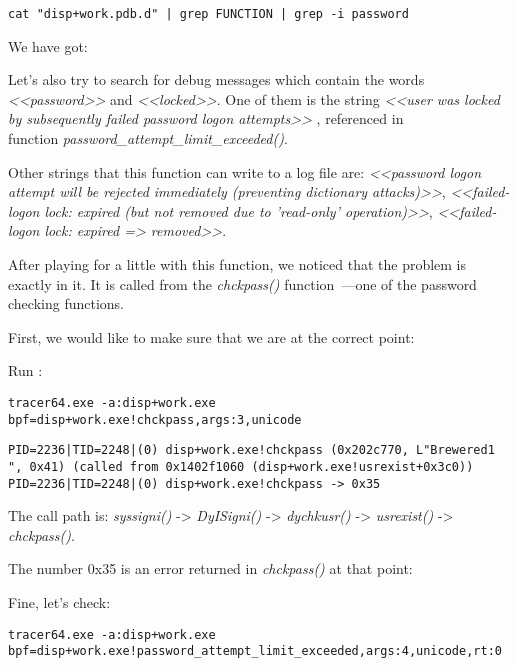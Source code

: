 \begin{lstlisting}
cat "disp+work.pdb.d" | grep FUNCTION | grep -i password
\end{lstlisting}

We have got:



Let's also try to search for debug messages which contain the words \emph{<<password>>} and \emph{<<locked>>}.
One of them is the string \emph{<<user was locked by subsequently failed password logon attempts>>} , referenced in \\
function \emph{password\_attempt\_limit\_exceeded()}.

Other strings that this function can write to a log file are: 
\emph{<<password logon attempt will be rejected immediately (preventing dictionary attacks)>>}, \emph{<<failed-logon lock: expired (but not removed due to 'read-only' operation)>>}, \emph{<<failed-logon lock: expired => removed>>}.

After playing for a little with this function, we noticed that the problem is exactly in it.
It is called from the \emph{chckpass()} function~---one of the password checking functions.

First, we would like to make sure that we are at the correct point:

Run \tracer:

\begin{lstlisting}
tracer64.exe -a:disp+work.exe bpf=disp+work.exe!chckpass,args:3,unicode
\end{lstlisting}

\begin{lstlisting}
PID=2236|TID=2248|(0) disp+work.exe!chckpass (0x202c770, L"Brewered1                               ", 0x41) (called from 0x1402f1060 (disp+work.exe!usrexist+0x3c0))
PID=2236|TID=2248|(0) disp+work.exe!chckpass -> 0x35
\end{lstlisting}

The call path is: \emph{syssigni()} -> \emph{DyISigni()} -> \emph{dychkusr()} -> \emph{usrexist()} -> \emph{chckpass()}.

The number 0x35 is an error returned in \emph{chckpass()} at that point:



Fine, let's check:

\begin{lstlisting}
tracer64.exe -a:disp+work.exe bpf=disp+work.exe!password_attempt_limit_exceeded,args:4,unicode,rt:0
\end{lstlisting}

